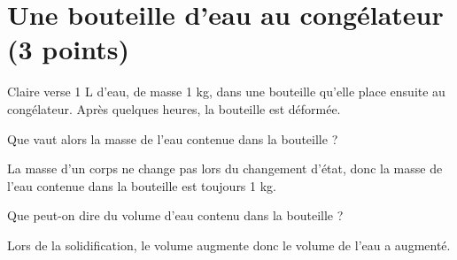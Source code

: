 \section{Une bouteille d'eau au congélateur (3 points)}\label{ex:congel}

Claire verse 1 L d'eau, de masse 1 kg, dans une bouteille qu'elle place ensuite au congélateur. Après quelques heures, la bouteille est déformée.

\begin{questions}
	\question[1\half] Que vaut alors la masse de l'eau contenue dans la bouteille ?
	\begin{solution}
		La masse d'un corps ne change pas lors du changement d'état, donc la masse de l'eau contenue dans la bouteille est toujours 1 kg.
	\end{solution}
	
	\question[1\half] Que peut-on dire du volume d'eau contenu dans la bouteille ?
	\begin{solution}
		Lors de la solidification, le volume augmente donc le volume de l'eau a augmenté.
	\end{solution}
\end{questions}